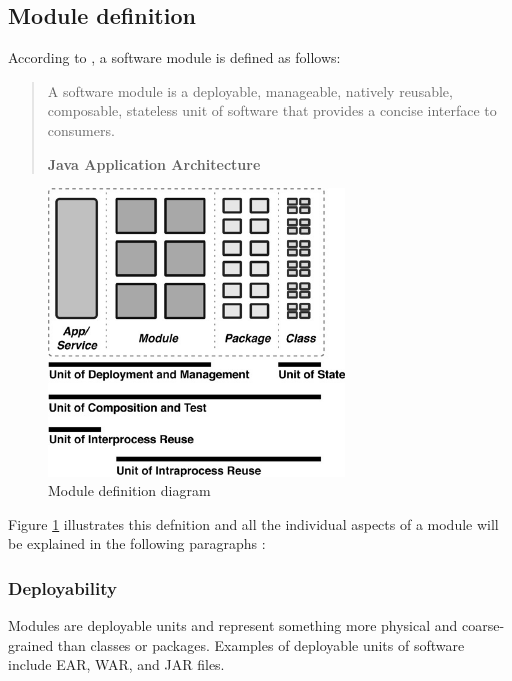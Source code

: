 \subsection{Module definition}
\label{sec:module}

According to \citeauthor{Knoernschild:2012}, a software module is defined as follows:

\begin{quote}
A software module is a deployable, manageable, natively reusable, composable, stateless unit of software that provides a concise interface to consumers. 

\hfill \textbf{Java Application Architecture}

\hfill \citeauthor{Knoernschild:2012} \cite{Knoernschild:2012}
\end{quote}

\begin{figure}[H]
\centering
\includegraphics[width=0.7\textwidth]{module.jpeg}
\caption{Module definition diagram}
\label{fig:module}
\end{figure}

Figure \ref{fig:module} illustrates this defnition and all the individual aspects of a module will be explained in the following paragraphs \cite{Knoernschild:2012}:

\newpage
\subsubsection{Deployability}
Modules are deployable units and represent something more physical and coarse-grained than classes or packages. Examples of deployable units of software include EAR, WAR, and JAR files.

